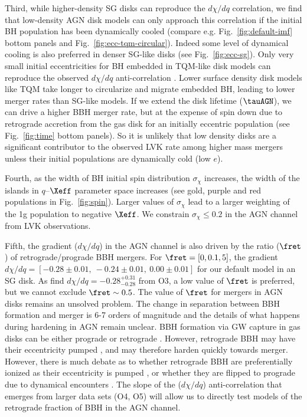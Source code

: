 Third, while higher-density SG disks can reproduce the $d\chi/dq$ correlation, we find that low-density AGN disk models can only approach this correlation if the initial BH population has been dynamically cooled (compare e.g.
Fig.~\ref{fig:default-imf} bottom panels and Fig.~\ref{fig:ecc-tqm-circular}).
Indeed some level of dynamical cooling is also preferred in denser SG-like disks (see Fig.~\ref{fig:ecc-sg}).
Only very small initial eccentricities for BH embedded in TQM-like disk models can reproduce the observed $d\chi/dq$ anti-correlation  \citep{Callister+21}.
Lower surface density disk models like TQM take longer to circularize and migrate embedded BH, leading to lower merger rates than SG-like models.
If we extend the disk lifetime ($\tauAGN$), we can drive a higher BBH merger rate, but at the expense of spin down due to retrograde accretion from the gas disk for an initially eccentric population (see Fig.~\ref{fig:time} bottom panels).
So it is unlikely that low density disks are a significant contributor to the observed LVK rate among higher mass mergers unless their initial populations are dynamically cold (low $e$).

Fourth, as the width of BH initial spin distribution $\sigma_\chi$ increases, the width of the islands in $q$--$\Xeff$ parameter space increases (see gold, purple and red populations in  Fig.~\ref{fig:spin}).
Larger values of $\sigma_\chi$ lead to a larger weighting of the 1g population to negative $\Xeff$.
We constrain $\sigma_\chi \leq 0.2$ in the AGN channel from LVK observations.

Fifth, the gradient ($d\chi/dq$) in the AGN channel is also driven by the ratio ($\fret$) of retrograde/prograde BBH mergers.
For $\fret=[0,0.1,5]$, the gradient $d\chi/dq=[-0.28\pm0.01,\ -0.24\pm0.01,\ 0.00\pm0.01]$ for our default model in an SG disk.
As \citet{Callister+21} find $d\chi/dq = -0.28^{+0.31}_{-0.28}$ from O3, a low value of $\fret$ is preferred, but we cannot exclude $\fret \sim 0.5$.
The value of $\fret$ for mergers in AGN disks remains an unsolved problem.
The change in separation between BBH formation and merger is 6-7 orders of magnitude and the details of what happens during hardening in AGN remain unclear.
BBH formation via GW capture in gas disks can be either prograde or retrograde \citep[e.g.][]{DeLaurentiis+23,Whitehead+24,QianLiLai24}.
However, retrograde BBH may have their eccentricity pumped \citep{Li+22-bbh-evo,Calcino+23}, and may therefore harden quickly towards merger.
However, there is much debate as to whether retrograde BBH are preferentially ionized as their eccentricity is pumped \citep{Wang+21}, or whether they are flipped to prograde due to dynamical encounters \citep{Samsing+22,McKernanFord24}.
The slope of the ($d\chi/dq$) anti-correlation that emerges from larger data sets (O4, O5) will allow us to directly test models of the retrograde fraction of BBH in the AGN channel.

